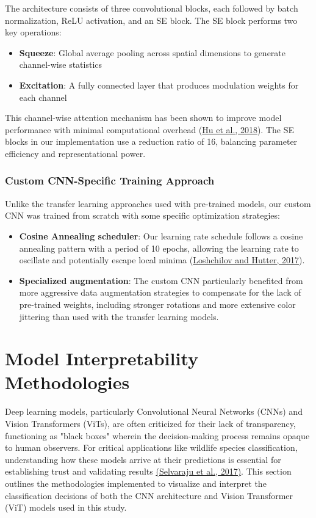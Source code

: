 \documentclass[a4paper,12pt]{report}
\begin{document}
The architecture consists of three convolutional blocks, each followed by batch normalization, ReLU activation, and an SE block. The SE block performs two key operations:
\begin{itemize}
    \item \textbf{Squeeze}: Global average pooling across spatial dimensions to generate channel-wise statistics
    \item \textbf{Excitation}: A fully connected layer that produces modulation weights for each channel
\end{itemize}

This channel-wise attention mechanism has been shown to improve model performance with minimal computational overhead (\href{https://openaccess.thecvf.com/content_cvpr_2018/papers/Hu_Squeeze-and-Excitation_Networks_CVPR_2018_paper.pdf}{Hu et al., 2018}). The SE blocks in our implementation use a reduction ratio of 16, balancing parameter efficiency and representational power.

\subsubsection{Custom CNN-Specific Training Approach}

Unlike the transfer learning approaches used with pre-trained models, our custom CNN was trained from scratch with some specific optimization strategies:

\begin{itemize}
    \item \textbf{Cosine Annealing scheduler}: Our learning rate schedule follows a cosine annealing pattern with a period of 10 epochs, allowing the learning rate to oscillate and potentially escape local minima (\href{https://arxiv.org/abs/1608.03983}{Loshchilov and Hutter, 2017}).
    
    \item \textbf{Specialized augmentation}: The custom CNN particularly benefited from more aggressive data augmentation strategies to compensate for the lack of pre-trained weights, including stronger rotations and more extensive color jittering than used with the transfer learning models.
\end{itemize}

\section{Model Interpretability Methodologies}

Deep learning models, particularly Convolutional Neural Networks (CNNs) and Vision Transformers (ViTs), are often criticized for their lack of transparency, functioning as "black boxes" wherein the decision-making process remains opaque to human observers. For critical applications like wildlife species classification, understanding how these models arrive at their predictions is essential for establishing trust and validating results \href{https://arxiv.org/abs/1610.02391}{(Selvaraju et al., 2017)}. This section outlines the methodologies implemented to visualize and interpret the classification decisions of both the CNN architecture and Vision Transformer (ViT) models used in this study.
\end{document}

